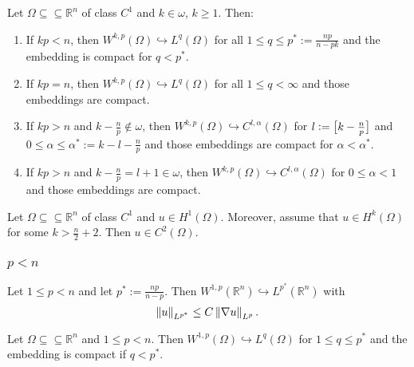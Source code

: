 \begin{theorem}
	\label{thm:Sobolev_embedding_theorem}
	Let $\Omega \subseteq \subseteq \mathbb{R}^n$ of class $C^1$ and $k \in \omega$, $k \geq 1$. Then:
	\begin{enumerate}[label = \textup{(}\alph*\textup{)},wide = 0pt]
		\item If $kp < n$, then $W^{k,p}(\Omega) \hookrightarrow L^q(\Omega)$ for all $1 \leq q \leq p^* := \frac{np}{n - pk}$ and the embedding is compact for $q < p^*$.
		\item If $kp = n$, then $W^{k,p}(\Omega) \hookrightarrow L^q(\Omega)$ for all $1 \leq q < \infty$ and those embeddings are compact.
		\item If $kp > n$ and $k - \frac{n}{p} \notin \omega$, then $W^{k,p}(\Omega) \hookrightarrow C^{l,\alpha}(\Omega)$ for $l := \sbr[1]{k - \frac{n}{p}}$ and $0 \leq \alpha \leq \alpha^* := k - l - \frac{n}{p}$ and those embeddings are compact for $\alpha < \alpha^*$.
		\item If $kp > n$ and $k - \frac{n}{p} = l + 1 \in \omega$, then $W^{k,p}(\Omega) \hookrightarrow C^{l,\alpha}(\Omega)$ for $0 \leq \alpha < 1$ and those embeddings are compact.
	\end{enumerate}
\end{theorem}

\begin{corollary}
	Let $\Omega \subseteq \subseteq \mathbb{R}^n$ of class $C^1$ and $u \in H^1(\Omega)$. Moreover, assume that $u \in H^k(\Omega)$ for some $k > \frac{n}{2} + 2$. Then $u \in C^2(\Omega)$.
\end{corollary}

\subsubsection*{$p < n$}

\begin{theorem}
	Let $1 \leq p < n$ and let $p^* := \frac{np}{n - p}$. Then $W^{1,p}(\mathbb{R}^n) \hookrightarrow L^{p^*}(\mathbb{R}^n)$ with
	\begin{equation*}
		\norm{u}_{L^{p^*}} \leq C \norm[0]{\nabla u}_{L^p}.
	\end{equation*}
\end{theorem}

\begin{theorem}
	Let $\Omega \subseteq \subseteq \mathbb{R}^n$ and $1 \leq p < n$. Then $W^{1,p}(\Omega) \hookrightarrow L^q(\Omega)$ for $1 \leq q \leq p^*$ and the embedding is compact if $q < p^*$.
\end{theorem}


